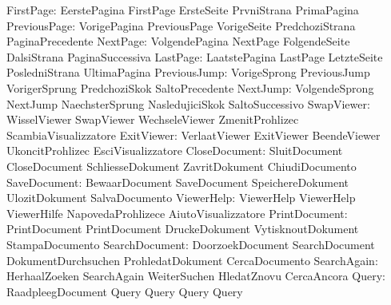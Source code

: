                 FirstPage: EerstePagina              FirstPage
                           ErsteSeite                PrvniStrana
                           PrimaPagina
             PreviousPage: VorigePagina              PreviousPage
                           VorigeSeite               PredchoziStrana
                           PaginaPrecedente
                 NextPage: VolgendePagina            NextPage
                           FolgendeSeite             DalsiStrana
                           PaginaSuccessiva
                 LastPage: LaatstePagina             LastPage
                           LetzteSeite               PosledniStrana
                           UltimaPagina
             PreviousJump: VorigeSprong              PreviousJump
                           VorigerSprung             PredchoziSkok
                           SaltoPrecedente
                 NextJump: VolgendeSprong            NextJump
                           NaechsterSprung           NasledujiciSkok
                           SaltoSuccessivo
               SwapViewer: WisselViewer              SwapViewer
                           WechseleViewer            ZmenitProhlizec
                           ScambiaVisualizzatore
               ExitViewer: VerlaatViewer             ExitViewer
                           BeendeViewer              UkoncitProhlizec
                           EsciVisualizzatore
            CloseDocument: SluitDocument             CloseDocument
                           SchliesseDokument         ZavritDokument
                           ChiudiDocumento
             SaveDocument: BewaarDocument            SaveDocument
                           SpeichereDokument         UlozitDokument
                           SalvaDocumento
               ViewerHelp: ViewerHelp                ViewerHelp
                           ViewerHilfe               NapovedaProhlizece
                           AiutoVisualizzatore
            PrintDocument: PrintDocument             PrintDocument
                           DruckeDokument            VytisknoutDokument
                           StampaDocumento
           SearchDocument: DoorzoekDocument          SearchDocument
                           DokumentDurchsuchen       ProhledatDokument
                           CercaDocumento
              SearchAgain: HerhaalZoeken             SearchAgain
                           WeiterSuchen              HledatZnovu
                           CercaAncora
                    Query: RaadpleegDocument         Query  
                           Query                     Query
                           Query                     %
